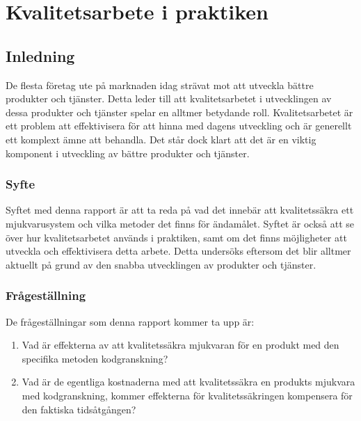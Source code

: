 \chapter{Kvalitetsarbete i praktiken}
\label{cha:indiv-report-wallstrom}


\section{Inledning}
\label{sec:introduction-wallstrom}

De flesta företag ute på marknaden idag strävat mot att utveckla bättre produkter och tjänster. Detta leder till att kvalitetsarbetet i utvecklingen av dessa produkter och tjänster spelar en alltmer betydande roll. Kvalitetsarbetet är ett problem att effektivisera för att hinna med dagens utveckling och är generellt ett komplext ämne att behandla. Det står dock klart att det är en viktig komponent i utveckling av bättre produkter och tjänster.

\subsection{Syfte}
\label{sec:purpose-wallstrom}

Syftet med denna rapport är att ta reda på vad det innebär att kvalitetssäkra ett mjukvarusystem och vilka metoder det finns för ändamålet. Syftet är också att se över hur kvalitetsarbetet används i praktiken, samt om det finns möjligheter att utveckla och effektivisera detta arbete. Detta undersöks eftersom det blir alltmer aktuellt på grund av den snabba utvecklingen av produkter och tjänster.

\subsection{Frågeställning}
\label{sec:issue-wallstrom}

De frågeställningar som denna rapport kommer ta upp är:

\begin{enumerate}
	\item Vad är effekterna av att kvalitetssäkra mjukvaran för en produkt med den specifika metoden kodgranskning?
	\item Vad är de egentliga kostnaderna med att kvalitetssäkra en produkts mjukvara med kodgranskning, kommer effekterna för kvalitetssäkringen kompensera för den faktiska tidsåtgången?
\end{enumerate}

